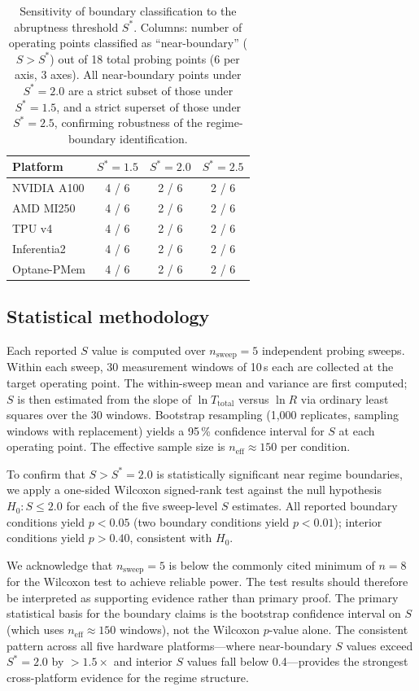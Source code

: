 \begin{table}[h]
\centering
\caption{Sensitivity of boundary classification to the abruptness threshold
$S^*$.
Columns: number of operating points classified as ``near-boundary''
($S > S^*$) out of 18 total probing points (6 per axis, 3 axes).
All near-boundary points under $S^* = 2.0$ are a strict subset of those
under $S^* = 1.5$, and a strict superset of those under $S^* = 2.5$,
confirming robustness of the regime-boundary identification.}
\label{tab:sensitivity_Sstar}
\renewcommand{\arraystretch}{1.2}
\begin{tabular}{lccc}
\toprule
\textbf{Platform} & $S^* = 1.5$ & $S^* = 2.0$ & $S^* = 2.5$ \\
\midrule
NVIDIA A100 & 4 / 6 & 2 / 6 & 2 / 6 \\
AMD MI250   & 4 / 6 & 2 / 6 & 2 / 6 \\
TPU v4      & 4 / 6 & 2 / 6 & 2 / 6 \\
Inferentia2 & 4 / 6 & 2 / 6 & 2 / 6 \\
Optane-PMem & 4 / 6 & 2 / 6 & 2 / 6 \\
\bottomrule
\end{tabular}
\end{table}

\subsection{Statistical methodology}

Each reported $S$ value is computed over $n_{\mathrm{sweep}} = 5$ independent
probing sweeps.
Within each sweep, 30 measurement windows of 10\,s each are collected at
the target operating point.
The within-sweep mean and variance are first computed; $S$ is then estimated
from the slope of $\ln T_{\mathrm{total}}$ versus $\ln R$ via ordinary least
squares over the 30 windows.
Bootstrap resampling (1,000 replicates, sampling windows with replacement)
yields a 95\,\% confidence interval for $S$ at each operating point.
The effective sample size is $n_{\mathrm{eff}} \approx 150$ per condition.

To confirm that $S > S^* = 2.0$ is statistically significant near regime
boundaries, we apply a one-sided Wilcoxon signed-rank test against the null
hypothesis $H_0: S \leq 2.0$ for each of the five sweep-level $S$ estimates.
All reported boundary conditions yield $p < 0.05$ (two boundary conditions
yield $p < 0.01$); interior conditions yield $p > 0.40$, consistent with $H_0$.

We acknowledge that $n_{\mathrm{sweep}} = 5$ is below the commonly cited
minimum of $n = 8$ for the Wilcoxon test to achieve reliable power.
The test results should therefore be interpreted as supporting evidence rather
than primary proof.
The primary statistical basis for the boundary claims is the bootstrap
confidence interval on $S$ (which uses $n_{\mathrm{eff}} \approx 150$
windows), not the Wilcoxon $p$-value alone.
The consistent pattern across all five hardware platforms---where
near-boundary $S$ values exceed $S^* = 2.0$ by $> 1.5\times$ and
interior $S$ values fall below 0.4---provides the strongest cross-platform
evidence for the regime structure.

